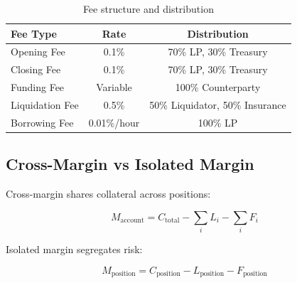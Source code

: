 \begin{table}[h]
\centering
\begin{tabular}{|l|c|c|}
\hline
\textbf{Fee Type} & \textbf{Rate} & \textbf{Distribution} \\
\hline
Opening Fee & 0.1\% & 70\% LP, 30\% Treasury \\
Closing Fee & 0.1\% & 70\% LP, 30\% Treasury \\
Funding Fee & Variable & 100\% Counterparty \\
Liquidation Fee & 0.5\% & 50\% Liquidator, 50\% Insurance \\
Borrowing Fee & 0.01\%/hour & 100\% LP \\
\hline
\end{tabular}
\caption{Fee structure and distribution}
\end{table}

\subsection{Cross-Margin vs Isolated Margin}

Cross-margin shares collateral across positions:

\begin{equation}
M_{\text{account}} = C_{\text{total}} - \sum_{i} L_i - \sum_{i} F_i
\end{equation}

Isolated margin segregates risk:

\begin{equation}
M_{\text{position}} = C_{\text{position}} - L_{\text{position}} - F_{\text{position}}
\end{equation}

